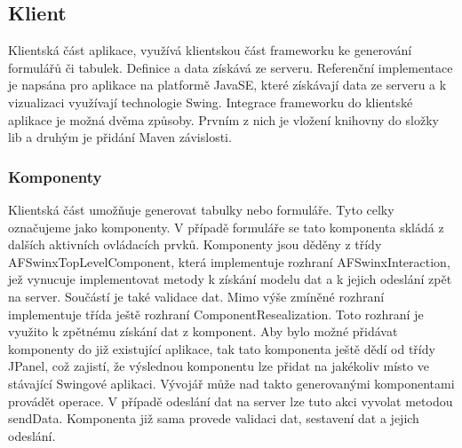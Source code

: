 \subsection{Klient}
Klientská část aplikace, využívá klientskou část frameworku ke generování formulářů či tabulek. Definice a data získává ze serveru. Referenční implementace je napsána pro aplikace na platformě JavaSE, které získávají data ze serveru a k vizualizaci využívají technologie Swing. Integrace frameworku do klientské aplikace je možná dvěma způsoby. Prvním z nich je vložení knihovny do složky lib a druhým je přidání Maven \cite{maven} závislosti. 
\subsubsection{Komponenty}
Klientská část umožňuje generovat tabulky nebo formuláře. Tyto celky označujeme jako komponenty. V případě formuláře se tato komponenta skládá z dalších aktivních ovládacích prvků. Komponenty jsou děděny z třídy AFSwinxTopLevelComponent, která implementuje rozhraní AFSwinxInteraction, jež vynucuje implementovat metody k získání modelu dat a k jejich odeslání zpět na server. Součástí je také validace dat. Mimo výše zmíněné rozhraní implementuje třída ještě rozhraní ComponentResealization. Toto rozhraní je využito k zpětnému získání dat z komponent. Aby bylo možné přidávat komponenty do již existující aplikace, tak tato komponenta ještě dědí od třídy JPanel, což zajistí, že výslednou komponentu lze přidat na jakékoliv místo ve stávající Swingové aplikaci. Vývojář může nad takto generovanými komponentami provádět operace. V případě odeslání dat na server lze tuto akci vyvolat metodou sendData. Komponenta již sama provede validaci dat, sestavení dat a jejich odeslání.

